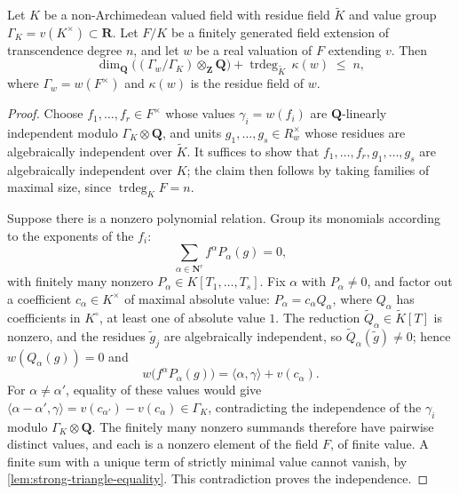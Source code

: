 \begin{lemma}
\label{lem:berk-abhyankar-valued}
Let $K$ be a non-Archimedean valued field with residue field
$\widetilde K$ and value group $\Gamma_K=v(K^\times)\subset\mathbf R$.
Let $F/K$ be a finitely generated field extension of transcendence
degree $n$, and let $w$ be a real valuation of $F$ extending
$v$.  Then
\[
 \dim_{\mathbf Q}
 \bigl((\Gamma_w/\Gamma_K)\otimes_{\mathbf Z}\mathbf Q\bigr)
 +\operatorname{trdeg}_{\widetilde K}\,\kappa(w)
 \;\leq\;n,
\]
where $\Gamma_w=w(F^\times)$ and $\kappa(w)$ is the residue field of
$w$.
\end{lemma}

\begin{proof}
Choose $f_1,\ldots,f_r\in F^\times$ whose values
$\gamma_i=w(f_i)$ are $\mathbf Q$-linearly independent modulo
$\Gamma_K\otimes\mathbf Q$, and units $g_1,\ldots,g_s\in R_w^\times$
whose residues are algebraically independent over $\widetilde K$.  It
suffices to show that $f_1,\ldots,f_r,g_1,\ldots,g_s$ are
algebraically independent over $K$; the claim then follows by taking
families of maximal size, since
$\operatorname{trdeg}_KF=n$.

Suppose there is a nonzero polynomial relation.  Group its monomials
according to the exponents of the $f_i$:
\[
 \sum_{\alpha\in\mathbf N^r}f^\alpha P_\alpha(g)=0,
\]
with finitely many nonzero $P_\alpha\in K[T_1,\ldots,T_s]$.  Fix
$\alpha$ with $P_\alpha\neq0$, and factor out a coefficient
$c_\alpha\in K^\times$ of maximal absolute value:
$P_\alpha=c_\alpha Q_\alpha$, where $Q_\alpha$ has coefficients in
$K^\circ$, at least one of absolute value $1$.  The reduction
$\widetilde Q_\alpha\in\widetilde K[T]$ is nonzero, and the residues
$\tilde g_j$ are algebraically independent, so
$\widetilde Q_\alpha(\tilde g)\neq0$; hence
$w(Q_\alpha(g))=0$ and
\[
 w\bigl(f^\alpha P_\alpha(g)\bigr)
 =\langle\alpha,\gamma\rangle+v(c_\alpha).
\]
For $\alpha\neq\alpha'$, equality of these values would give
$\langle\alpha-\alpha',\gamma\rangle=v(c_{\alpha'})-v(c_\alpha)
\in\Gamma_K$, contradicting the independence of the $\gamma_i$
modulo $\Gamma_K\otimes\mathbf Q$.  The finitely many nonzero
summands therefore have pairwise distinct values, and each is a nonzero
element of the field $F$, of finite value.  A finite sum with a
unique term of strictly minimal value cannot vanish, by
\cref{lem:strong-triangle-equality}.  This contradiction proves the
independence.
\end{proof}

